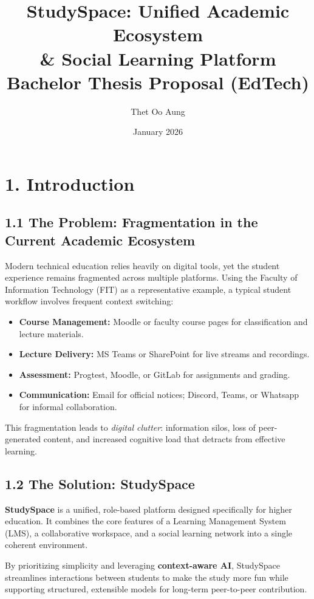 \documentclass[11pt, a4paper]{article}
\title{\textbf{StudySpace: Unified Academic Ecosystem \\ \& Social Learning Platform} \\ [2em]
\large Bachelor Thesis Proposal (EdTech)}
\author{Thet Oo Aung}
\date{January 2026}
\begin{document}
\maketitle

\section{1. Introduction}

\subsection{1.1 The Problem: Fragmentation in the Current Academic Ecosystem}
Modern technical education relies heavily on digital tools, yet the student experience remains fragmented across multiple platforms. Using the Faculty of Information Technology (FIT) as a representative example, a typical student workflow involves frequent context switching:

\begin{itemize}
    \item \textbf{Course Management:} Moodle or faculty course pages for classification and lecture materials.
    \item \textbf{Lecture Delivery:} MS Teams or SharePoint for live streams and recordings.
    \item \textbf{Assessment:} Progtest, Moodle, or GitLab for assignments and grading.
    \item \textbf{Communication:} Email for official notices; Discord, Teams, or Whatsapp for informal collaboration.
\end{itemize}

This fragmentation leads to \textit{digital clutter}: information silos, loss of peer-generated content, and increased cognitive load that detracts from effective learning.

\subsection{1.2 The Solution: StudySpace}
\textbf{StudySpace} is a unified, role-based platform designed specifically for higher education. It combines the core features of a Learning Management System (LMS), a collaborative workspace, and a social learning network into a single coherent environment.

By prioritizing simplicity and leveraging \textbf{context-aware AI}, StudySpace streamlines interactions between students to make the study more fun while supporting structured, extensible models for long-term peer-to-peer contribution.
\end{document}
